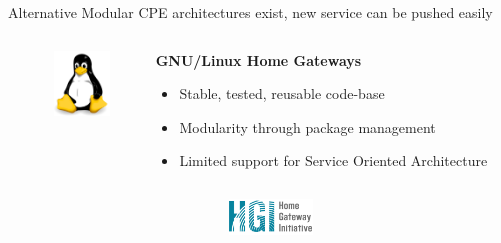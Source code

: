 \documentclass[a4paper]{beamer}
\begin{document}
\begin{frame}{Alternative Modular CPE architectures exist, new service can be pushed easily}
							
							
	\begin{columns}[T]
		\begin{column}{.01\textwidth} %
		\end{column}
		\begin{column}[T]{0.15 \textwidth} 
			\vspace{1em}
			\includegraphics[width=4em]{tux.png}
		\end{column}
																						
																										
		\begin{column}[T]{0.70 \textwidth} 
																																							
																																								   
			\textbf{ GNU/Linux Home Gateways}
			\begin{itemize}
				\item Stable, tested, reusable code-base
				\item Modularity through package management
				\item Limited support for Service Oriented Architecture
			\end{itemize}
			\vspace{3mm}
																																								     
																																							
		\end{column}
																										
	\end{columns}
								
								
	\begin{columns}[T]
		\begin{column}{.01\textwidth} %
		\end{column}
		\begin{column}[T]{0.15 \textwidth} 
			\vspace{2em}
			\includegraphics[width=6em]{hgi.png}
		\end{column}
																						

\end{columns}
\end{frame}
\end{document}
